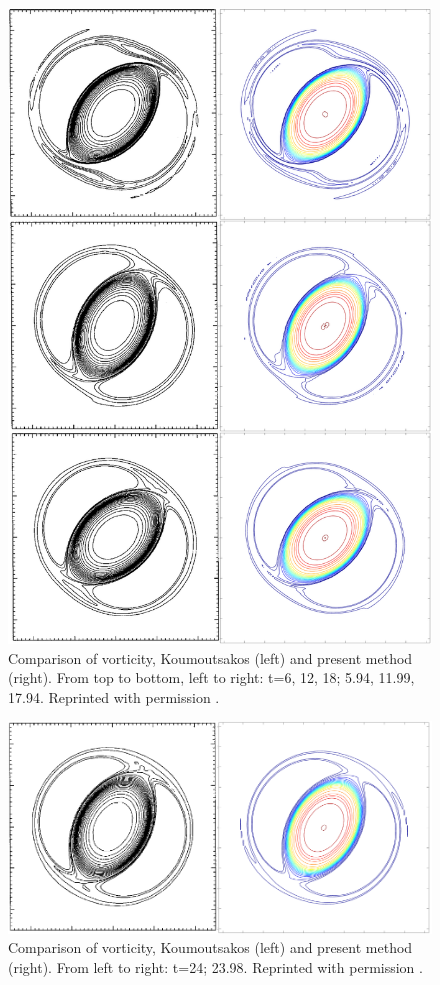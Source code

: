 \documentclass[letterpaper,12pt]{report}
\begin{document}
\begin{figure}
\centering
\includegraphics[width=1\textwidth]{KoumComp2.PNG}
\caption{\label{fig:KoumComp2}Comparison of vorticity, Koumoutsakos \cite{Koum1997} (left) and present method (right). From top to bottom, left to right: t=6, 12, 18; 5.94, 11.99, 17.94. Reprinted with permission \cite{KoumLic}.}
\end{figure}
\begin{figure}
\centering
\includegraphics[width=1\textwidth]{KoumComp3.PNG}
\caption{\label{fig:KoumComp3}Comparison of vorticity, Koumoutsakos \cite{Koum1997} (left) and present method (right). From left to right: t=24; 23.98. Reprinted with permission \cite{KoumLic}.}
\end{figure}
\end{document}
